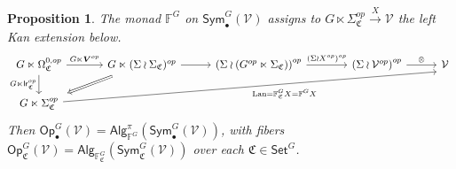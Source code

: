 \documentclass[a4paper,10pt
,draft
]{article}%
\numberwithin{equation}{section}
\numberwithin{figure}{section}
\newtheorem{proposition}[equation]{Proposition}%
\theoremstyle{definition} %
\newcommand{\Sym}{\ensuremath{\mathsf{Sym}}}%
\newcommand{\Set}{\ensuremath{\mathsf{Set}}}
\newcommand{\Op}{\mathsf{Op}}%
\newcommand{\Alg}{\mathsf{Alg}}
\DeclareMathOperator{\Lan}{Lan}%
\newcommand{\V}{\ensuremath{\mathcal V}}
\newcommand{\1}{\ensuremath{\mathbbm 1}}%
\begin{document}
\begin{proposition}\label{FGC PROP}
	The monad $\mathbb{F}^G$ on $\mathsf{Sym}^G_{\bullet}(\V)$
	assigns to 
	$G \ltimes \Sigma^{op}_{\mathfrak{C}} \xrightarrow{X} \V$
	the left Kan extension below.
	\begin{equation}\label{FGC_EQ}
                \begin{tikzcd}[column sep = 28pt]
                        G \ltimes \Omega^{0,op}_{\mathfrak{C}}
                        \arrow[d, "G \ltimes \mathsf{lr}_{\mathfrak C}^{op}"']
                        \arrow[r, "G \ltimes \boldsymbol{V}^{op}"]
                        &[6pt]
                        G \ltimes (\Sigma \wr \Sigma_{\mathfrak{C}})^{op} \arrow{r}
                        \arrow[dl, Rightarrow, shorten >=0.15cm,shorten <=0.15cm]
                        &
                        \left( \Sigma \wr \left( G^{op} \ltimes \Sigma_{\mathfrak{C}} \right) \right)^{op}
                        \arrow[r, "(\Sigma \wr X^{op})^{op}"]
                        &[10pt]
                        \left(\Sigma \wr \V^{op}\right)^{op} \arrow[r, "\otimes"]
                        &
                        \V
                        \\
                        G \ltimes \Sigma^{op}_{\mathfrak{C}}
                        \arrow[urrrr, "\Lan = \mathbb F_{\mathfrak{C}}^G X = \mathbb F^G X"', end anchor = south west]
                \end{tikzcd}
        \end{equation}
        Then $\Op_\bullet^G(\V) = \Alg^\pi_{\mathbb F^G}(\Sym_\bullet^G(\V))$,
        with fibers $\Op_{\mathfrak C}^G(\V) = \Alg_{\mathbb F_{\mathfrak C}^G}(\Sym_{\mathfrak C}^G(\V))$ over each $\mathfrak C \in \Set^G$. %
\end{proposition}
\end{document}
